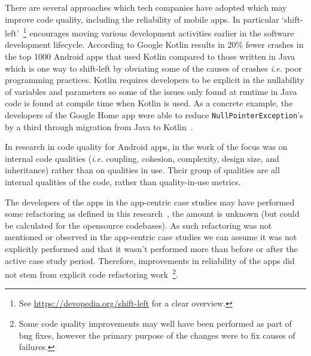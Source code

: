 There are several approaches which tech companies have adopted which may improve code quality, including the reliability of mobile apps. In particular `shift-left'~\footnote{See \url{https://devopedia.org/shift-left} for a clear overview.} encourages moving various development activities earlier in the software development lifecycle. According to Google Kotlin results in 20\% fewer crashes in the top 1000 Android apps that used Kotlin compared to those written in Java~\citep{googleblogs2021_androids_kotlin_first_approach, muntenescu2020_fewer_crashes_and_more_stability_with_kotlin} which is one way to shift-left by obviating some of the causes of crashes \emph{i.e.} poor programming practices. Kotlin requires developers to be explicit in the nullability of variables and parameters so some of the issues only found at runtime in Java code is found at compile time when Kotlin is used. As a concrete example, the developers of the Google Home app were able to reduce \texttt{NullPointerException}'s by a third through migration from Java to Kotlin~\citep{googleblogs2020_google_home_reduces_crashes_by_a_third}.

In research in code quality for Android apps, in the work of \citet{Hamdi2021empirical} the focus was on internal code qualities (\emph{i.e.} coupling, cohesion, complexity, design size, and inheritance) rather than on qualities in use. Their group of qualities are all internal qualities of the code, rather than quality-in-use metrics. 

The developers of the apps in the app-centric case studies may have performed some refactoring as defined in this research~\citep{Hamdi2021empirical}, the amount is unknown (but could be calculated for the opensource codebases). As such refactoring was not mentioned or observed in the app-centric case studies we can assume it was not explicitly performed and that it wasn't performed more than before or after the active case study period. Therefore, improvements in reliability of the apps did not stem from explicit code refactoring work~\footnote{Some code quality improvements may well have been performed as part of bug fixes, however the primary purpose of the changes were to fix causes of failures.}.

